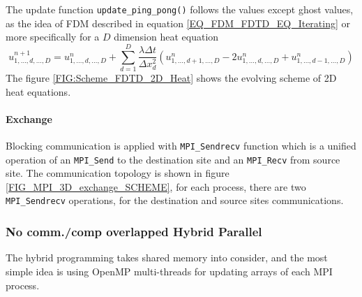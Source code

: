 The update function \texttt{update\_ping\_pong()} follows the values except ghost values, as the idea of FDM described in equation \ref{EQ_FDM_FDTD_EQ_Iterating}
or more specifically for a $D$ dimension heat equation
\begin{equation}
  u^{n+1}_{1,\dots,d,\dots,D} = 
      u^{n}_{1, \dots,d, \dots,D}
    + \sum_{d=1}^{D}\frac{\lambda \Delta t}{\Delta x_d^2}
  \left(
      u^{n}_{1,\dots,d+1, \dots,D} 
    - 2u^{n}_{1,\dots,d, \dots,D} 
    + u^{n}_{1,\dots,d-1, \dots,D}
  \right)
\end{equation}
The figure \ref{FIG:Scheme_FDTD_2D_Heat} shows the evolving scheme of 2D heat equations.


\paragraph{Exchange}
Blocking communication is applied with \texttt{MPI\_Sendrecv} function which is a unified operation of 
an \texttt{MPI\_Send} to the destination site 
and an \texttt{MPI\_Recv} from source site.
The communication topology is shown in figure \ref{FIG_MPI_3D_exchange_SCHEME}, 
for each process, there are two \texttt{MPI\_Sendrecv} operations, for the destination and source sites communications.



\subsubsection{No comm./comp overlapped Hybrid Parallel}\label{SEC:HYBRID_0}
The hybrid programming takes shared memory into consider, and the most simple idea is using OpenMP multi-threads for updating 
arrays of each MPI process.

